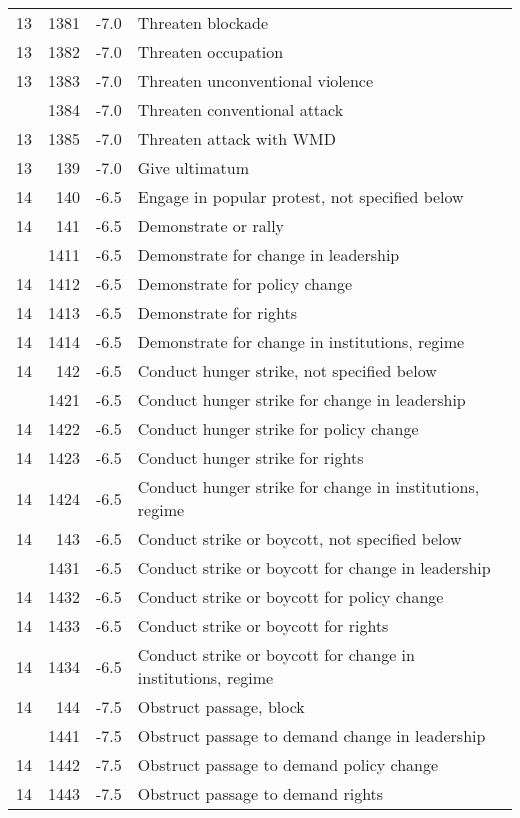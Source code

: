 \documentclass[10pt,]{article}
\begin{document}
\begin{longtable}[t]{rrrl}
13 & 1381 & -7.0 & Threaten blockade\\
13 & 1382 & -7.0 & Threaten occupation\\
13 & 1383 & -7.0 & Threaten unconventional violence\\
\addlinespace
13 & 1384 & -7.0 & Threaten conventional attack\\
13 & 1385 & -7.0 & Threaten attack with WMD\\
13 & 139 & -7.0 & Give ultimatum\\
14 & 140 & -6.5 & Engage in popular protest, not specified below\\
14 & 141 & -6.5 & Demonstrate or rally\\
\addlinespace
14 & 1411 & -6.5 & Demonstrate for change in leadership\\
14 & 1412 & -6.5 & Demonstrate for policy change\\
14 & 1413 & -6.5 & Demonstrate for rights\\
14 & 1414 & -6.5 & Demonstrate for change in institutions, regime\\
14 & 142 & -6.5 & Conduct hunger strike, not specified below\\
\addlinespace
14 & 1421 & -6.5 & Conduct hunger strike for change in leadership\\
14 & 1422 & -6.5 & Conduct hunger strike for policy change\\
14 & 1423 & -6.5 & Conduct hunger strike for rights\\
14 & 1424 & -6.5 & Conduct hunger strike for change in institutions, regime\\
14 & 143 & -6.5 & Conduct strike or boycott, not specified below\\
\addlinespace
14 & 1431 & -6.5 & Conduct strike or boycott for change in leadership\\
14 & 1432 & -6.5 & Conduct strike or boycott for policy change\\
14 & 1433 & -6.5 & Conduct strike or boycott for rights\\
14 & 1434 & -6.5 & Conduct strike or boycott for change in institutions, regime\\
14 & 144 & -7.5 & Obstruct passage, block\\
\addlinespace
14 & 1441 & -7.5 & Obstruct passage to demand change in  leadership\\
14 & 1442 & -7.5 & Obstruct passage to demand policy change\\
14 & 1443 & -7.5 & Obstruct passage to demand rights\\

\end{longtable}
\end{document}
